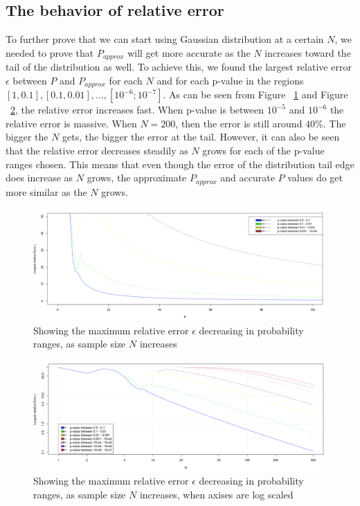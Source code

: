 \documentclass[12pt]{article}
\begin{document}
{\subsection{The behavior of relative error}
To further prove that we can start using Gaussian distribution at a certain $N$, we needed to prove that $P_{approx}$ will get more accurate as the $N$ increases toward the tail of the distribution as well. To achieve this, we found the largest relative error $\epsilon$ between $P$ and $P_{approx}$ for each $N$ and for each p-value in the regions $[1, 0.1], [0.1, 0.01], ... , [10^{-6};10^{-7}]$. As can be seen from Figure ~\ref{fig:LargestApproxPRelativeError0_100} and Figure ~\ref{fig:LargestApproxPRelativeError100_500}, the relative error increases fast. When p-value is between $10^{-5}$ and $10^{-6}$ the relative error is massive. When $N=200$, then the error is still around $40\%$. The bigger the $N$ gets, the bigger the error at the tail. However, it can also be seen that the relative error decreases steadily as $N$ grows for each of the p-value ranges chosen. This means that even though the error of the distribution tail edge does increase as $N$ grows, the approximate $P_{approx}$ and accurate $P$ values do get more similar as the $N$ grows.

\begin{figure}[H]
  \centering
  \includegraphics[width=1\textwidth]{LargestApproxPRelativeError0_100}
  \caption{Showing the maximum relative error $\epsilon$ decreasing in probability ranges, as sample size $N$ increases}
  \label{fig:LargestApproxPRelativeError0_100}
\end{figure}

\begin{figure}[H]
  \centering
  \includegraphics[width=1\textwidth]{LargestApproxPRelativeError100_500}
  \caption{Showing the maximum relative error $\epsilon$ decreasing in probability ranges, as sample size $N$ increases, when axises are log scaled}
  \label{fig:LargestApproxPRelativeError100_500}
\end{figure}

}
\end{document}
